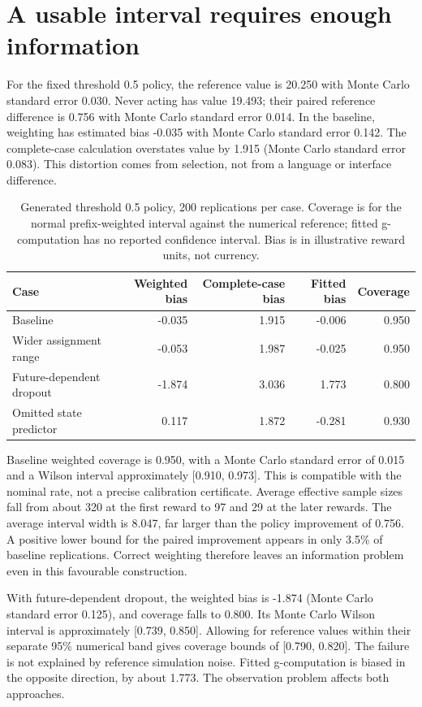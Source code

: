 \section{A usable interval requires enough information}
For the fixed threshold 0.5 policy, the reference value is 20.250 with Monte
Carlo standard error 0.030. Never acting has value 19.493; their paired
reference difference is 0.756 with Monte Carlo standard error 0.014. In the
baseline, weighting has estimated bias -0.035 with Monte Carlo standard
error 0.142. The complete-case calculation overstates value by 1.915
(Monte Carlo standard error 0.083). This distortion comes from selection,
not from a language or interface difference.

\begin{table}[htbp]
\centering\small
\begin{tabular}{lrrrr}
\toprule
Case & Weighted bias & Complete-case bias & Fitted bias & Coverage \\
\midrule
Baseline & -0.035 & 1.915 & -0.006 & 0.950 \\
Wider assignment range & -0.053 & 1.987 & -0.025 & 0.950 \\
Future-dependent dropout & -1.874 & 3.036 & 1.773 & 0.800 \\
Omitted state predictor & 0.117 & 1.872 & -0.281 & 0.930 \\
\bottomrule
\end{tabular}
\caption{Generated threshold 0.5 policy, 200 replications per case. Coverage
is for the normal prefix-weighted interval against the numerical reference;
fitted g-computation has no reported confidence interval. Bias is in
illustrative reward units, not currency.}
\end{table}

Baseline weighted coverage is 0.950, with a Monte Carlo standard error of
0.015 and a Wilson interval approximately [0.910, 0.973]. This is compatible
with the nominal rate, not a precise calibration certificate. Average
effective sample sizes fall from about 320 at the first reward to 97 and
29 at the later rewards. The average interval width is 8.047, far larger
than the policy improvement of 0.756. A positive lower bound for the paired
improvement appears in only 3.5\% of baseline replications. Correct weighting
therefore leaves an information problem even in this favourable construction.

With future-dependent dropout, the weighted bias is -1.874 (Monte Carlo
standard error 0.125), and coverage falls to 0.800. Its Monte Carlo Wilson
interval is approximately [0.739, 0.850]. Allowing for reference values within
their separate 95\% numerical band gives coverage bounds of [0.790, 0.820].
The failure is not explained by reference simulation noise. Fitted
g-computation is biased in the opposite direction, by about 1.773. The
observation problem affects both approaches.

